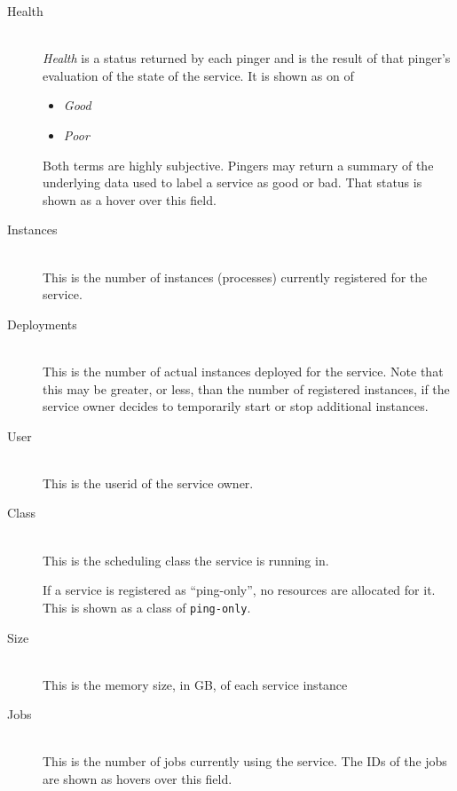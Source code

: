 \begin{description}
            \item[Health] \hfill \\
              {\em Health} is a status returned by each pinger and is the result of that pinger's
              evaluation of the state of the service.  It is shown as on of
              \begin{itemize}
                \item {\em Good}
                \item {\em Poor}
              \end{itemize}
              Both terms are highly subjective.  Pingers may return a summary of the underlying
              data used to label a service as good or bad.  That status is shown as a hover over
              this field.
              
            \item[Instances] \hfill \\
              This is the number of instances (processes) currently registered for the service.  

            \item[Deployments] \hfill \\
              This is the number of actual instances deployed for the service.  Note that this may
              be greater, or less, than the number of registered instances, if the service owner
              decides to temporarily start or stop additional instances.

            \item[User] \hfill \\
              This is the userid of the service owner.
              
            \item[Class] \hfill \\
              This is the scheduling class the service is running in. 
              
              If a service is registered as ``ping-only'', no resources are allocated for it.  This
              is shown as a class of {\tt ping-only}.
              
            \item[Size] \hfill \\
              This is the memory size, in GB, of each service instance

            \item[Jobs] \hfill \\
              This is the number of jobs currently using the service.  The IDs of the jobs are
              shown as hovers over this field.


\end{description}
